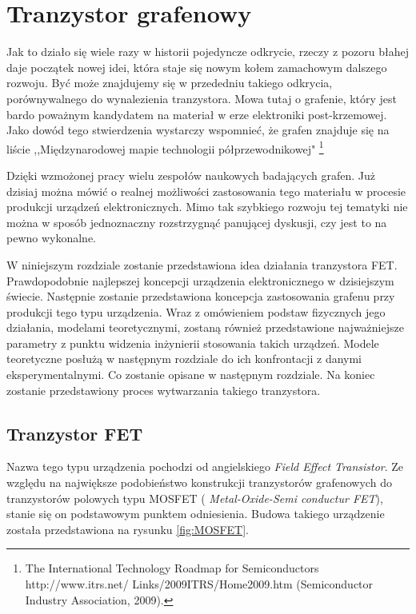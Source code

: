 \chapter{Tranzystor grafenowy}

Jak to działo się wiele razy w historii pojedyncze odkrycie, rzeczy z pozoru błahej daje początek
nowej idei, która staje się nowym kołem zamachowym dalszego rozwoju. Być może znajdujemy się 
w przededniu takiego odkrycia, porównywalnego do wynalezienia tranzystora. Mowa tutaj o grafenie, 
który jest bardo poważnym kandydatem na materiał w erze elektroniki post-krzemowej. 
Jako dowód tego stwierdzenia wystarczy wspomnieć, że grafen znajduje się na liście 
,,Międzynarodowej mapie technologii półprzewodnikowej" \footnote{The International Technology Roadmap for Semiconductors http://www.itrs.net/
Links/2009ITRS/Home2009.htm (Semiconductor Industry Association, 2009).}

Dzięki wzmożonej pracy wielu zespołów naukowych badających grafen. Już dzisiaj można mówić o realnej 
możliwości zastosowania tego materiału w procesie produkcji urządzeń elektronicznych. Mimo tak szybkiego 
rozwoju tej tematyki nie można w sposób jednoznaczny rozstrzygnąć panującej dyskusji, czy jest to na 
pewno wykonalne. 

W niniejszym rozdziale zostanie przedstawiona idea działania tranzystora FET. Prawdopodobnie najlepszej 
koncepcji urządzenia elektronicznego w dzisiejszym świecie. Następnie zostanie przedstawiona koncepcja 
zastosowania grafenu przy produkcji tego typu urządzenia. Wraz z omówieniem podstaw fizycznych jego działania,
modelami teoretycznymi, zostaną również przedstawione najważniejsze parametry z punktu widzenia inżynierii
stosowania takich urządzeń. Modele teoretyczne posłużą w następnym rozdziale do ich konfrontacji z danymi
eksperymentalnymi. Co zostanie opisane w następnym rozdziale. Na koniec zostanie przedstawiony proces 
wytwarzania takiego tranzystora.


	\section{Tranzystor FET}
Nazwa tego typu urządzenia pochodzi od angielskiego \textit{Field Effect Transistor}. Ze względu na największe
podobieństwo konstrukcji tranzystorów grafenowych do tranzystorów polowych typu MOSFET (\textit{ Metal-Oxide-Semi
conductur FET}), stanie się on podstawowym punktem odniesienia.
Budowa takiego urządzenie została przedstawiona na rysunku \ref{fig:MOSFET}. 


